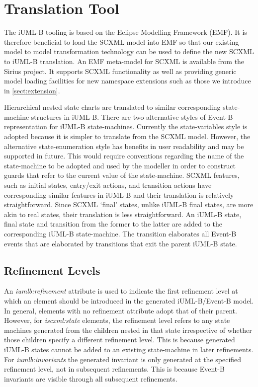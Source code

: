 
\section{Translation Tool}

The iUML-B tooling is based on the Eclipse Modelling Framework (EMF). 
It is therefore beneficial to load the SCXML model into EMF so that 
our existing model to model transformation technology can be used to 
define the new SCXML to iUML-B translation. An EMF meta-model for SCXML 
is available from the Sirius \cite{siriuswebsite}
project. It supports SCXML functionality as well as providing generic model
loading facilities for new namespace extensions such as those we 
introduce in \ref{sect:extension}.

Hierarchical nested state charts are translated to similar corresponding 
state-machine structures in iUML-B. There are two alternative styles of 
Event-B representation for iUML-B state-machines.  Currently the state-variables 
style is adopted because it is simpler to translate from the SCXML model. 
However, the alternative state-enumeration style has benefits in user readability 
and may be supported in future. This would  require conventions regarding 
the name of the state-machine  to be adopted and used by the modeller in order 
to construct guards that refer to the current value of the state-machine.
SCXML features, such as initial states, entry/exit actions, and transition 
actions have corresponding similar features in iUML-B and their translation 
is relatively straightforward. Since SCXML `final' states, unlike iUML-B 
final states, are more akin to real states, their translation is less straightforward. 
An iUML-B state, final state and transition from the former to the latter are 
added to the corresponding iUML-B state-machine. The transition elaborates 
all Event-B events that are elaborated by transitions that exit the parent 
iUML-B state. 

\subsection{Refinement Levels}
An \emph{iumlb:refinement} attribute is used to indicate the first refinement 
level at which an element should be introduced in the generated iUML-B/Event-B model. 
In general, elements with no refinement attribute adopt that of their parent.  
However, for \emph{iscxml:state} elements, the refinement level refers to any state 
machines generated from the children nested in that state irrespective of whether 
those children specify a different refinement level. This is because generated 
iUML-B states cannot be added to an existing state-machine in later refinements.
For \emph{iumlb:invariants} the generated invariant is only  generated at the 
specified refinement level, not in  subsequent refinements. This is because Event-B 
invariants are visible through all subsequent refinements.

